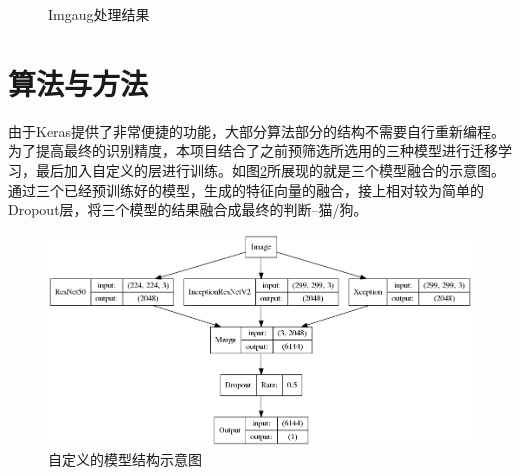 \documentclass[a4paper,11pt]{article}
\begin{document}
\begin{figure}[htb]
{\label{fig:cat4}
}
\caption{Imgaug处理结果}
\label{fig:cats}
\end{figure}


\section{算法与方法}
\label{sec:org59c1e6b}
由于Keras提供了非常便捷的功能，大部分算法部分的结构不需要自行重新编程。为了提高最终的识别精度，本项目结合了之前预筛选所选用的三种模型进行迁移学习，最后加入自定义的层进行训练。如图\ref{fig:selfmodel}所展现的就是三个模型融合的示意图。通过三个已经预训练好的模型，生成的特征向量的融合，接上相对较为简单的Dropout层，将三个模型的结果融合成最终的判断--猫/狗。

\begin{figure}[htb]
\centering
\includegraphics[scale=0.38]{./figure/eg.png}
\caption{自定义的模型结构示意图}
\label{fig:selfmodel}
\end{figure}
\end{document}
